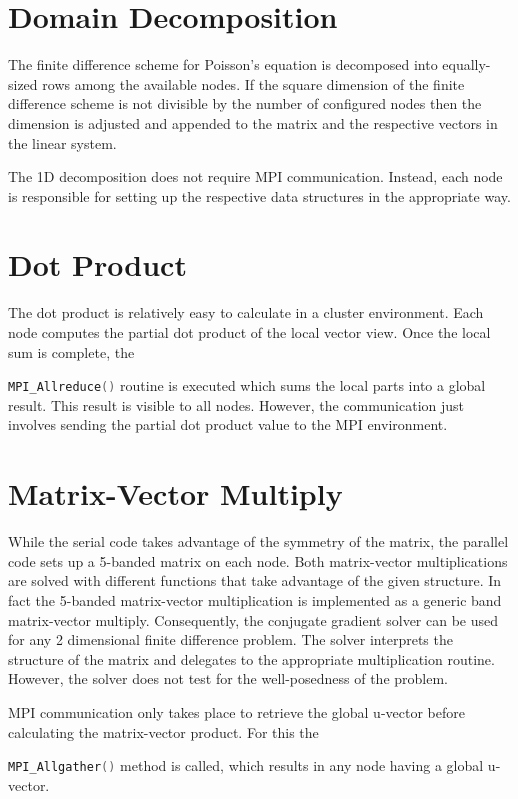 \documentclass[12pt,a4paper]{report}
\def\ccode#1{
  \lstinline[basicstyle=\ttfamily,language=C]{#1} }
\begin{document}
\section{Domain Decomposition}
\label{sec:domain-decomposition}

The finite difference scheme for Poisson's equation is decomposed into
equally-sized rows among the available nodes. If the square dimension
of the finite difference scheme is not divisible by the number of
configured nodes then the dimension is adjusted and appended to the
matrix and the respective vectors in the linear system.

The 1D decomposition does not require MPI communication. Instead, each
node is responsible for setting up the respective data structures in
the appropriate way.


\section{Dot Product}
\label{sec:dot-product}

The dot product is relatively easy to calculate in a cluster
environment. Each node computes the partial dot product of the local
vector view. Once the local sum is complete, the
\ccode{MPI_Allreduce()} routine is executed which sums the local parts
into a global result. This result is visible to all nodes. However,
the communication just involves sending the partial dot product value
to the MPI environment.

\section{Matrix-Vector Multiply}
\label{sec:matr-vect-mult}

While the serial code takes advantage of the symmetry of the matrix,
the parallel code sets up a 5-banded matrix on each node. Both
matrix-vector multiplications are solved with different functions that
take advantage of the given structure. In fact the 5-banded
matrix-vector multiplication is implemented as a generic band
matrix-vector multiply. Consequently, the conjugate gradient solver
can be used for any 2 dimensional finite difference problem. The
solver interprets the structure of the matrix and delegates to the
appropriate multiplication routine. However, the solver does not test
for the well-posedness of the problem.

MPI communication only takes place to retrieve the global u-vector
before calculating the matrix-vector product. For this the
\ccode{MPI_Allgather()} method is called, which results in any node
having a global u-vector.
\end{document}
